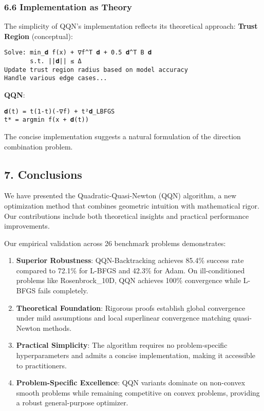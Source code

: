 \hypertarget{implementation-as-theory}{%
\subsubsection{6.6 Implementation as Theory}\label{implementation-as-theory}}

The simplicity of QQN's implementation reflects its theoretical approach:
\textbf{Trust Region} (conceptual):

\begin{verbatim}
Solve: min_𝐝 f(x) + ∇f^T 𝐝 + 0.5 𝐝^T B 𝐝
       s.t. ||𝐝|| ≤ Δ
Update trust region radius based on model accuracy
Handle various edge cases...
\end{verbatim}

\textbf{QQN}:

\begin{verbatim}
𝐝(t) = t(1-t)(-∇f) + t²𝐝_LBFGS
t* = argmin f(x + 𝐝(t))
\end{verbatim}

The concise implementation suggests a natural formulation of the direction combination problem.

\hypertarget{conclusions}{%
\subsection{7. Conclusions}\label{conclusions}}

We have presented the Quadratic-Quasi-Newton (QQN) algorithm, a new optimization method that combines geometric
intuition with mathematical rigor. Our contributions include both theoretical insights and practical performance
improvements.

Our empirical validation across 26 benchmark problems demonstrates:

\begin{enumerate}
\def\labelenumi{\arabic{enumi}.}
\item
  \textbf{Superior Robustness}: QQN-Backtracking achieves 85.4\% success rate compared to 72.1\% for L-BFGS and 42.3\%
  for Adam. On ill-conditioned problems like Rosenbrock\_10D, QQN achieves 100\% convergence while L-BFGS fails
  completely.
\item
  \textbf{Theoretical Foundation}: Rigorous proofs establish global convergence under mild assumptions and local
  superlinear convergence matching quasi-Newton methods.
\item
  \textbf{Practical Simplicity}: The algorithm requires no problem-specific hyperparameters and admits a concise
  implementation, making it accessible to practitioners.
\item
  \textbf{Problem-Specific Excellence}: QQN variants dominate on non-convex smooth problems while remaining competitive
  on convex problems, providing a robust general-purpose optimizer.
\end{enumerate}

